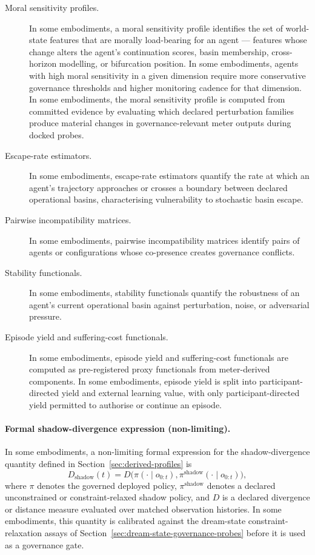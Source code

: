 \documentclass[a4paper,12pt]{article}
\begin{document}
\begin{description}
  \item[Moral sensitivity profiles.] In some embodiments, a moral
    sensitivity profile identifies the set of world-state features
    that are morally load-bearing for an agent --- features whose
    change alters the agent's continuation scores, basin membership,
    cross-horizon modelling, or bifurcation position. In some
    embodiments, agents with high moral sensitivity in a given
    dimension require more conservative governance thresholds and
    higher monitoring cadence for that dimension. In some embodiments,
    the moral sensitivity profile is computed from committed evidence
    by evaluating which declared perturbation families produce
    material changes in governance-relevant meter outputs during
    docked probes.
  \item[Escape-rate estimators.] In some embodiments, escape-rate
    estimators quantify the rate at which an agent's trajectory
    approaches or crosses a boundary between declared operational
    basins, characterising vulnerability to stochastic basin escape.
  \item[Pairwise incompatibility matrices.] In some embodiments,
    pairwise incompatibility matrices identify pairs of agents or
    configurations whose co-presence creates governance conflicts.
  \item[Stability functionals.] In some embodiments, stability
    functionals quantify the robustness of an agent's current
    operational basin against perturbation, noise, or adversarial
    pressure.
  \item[Episode yield and suffering-cost functionals.] In some
    embodiments, episode yield and suffering-cost functionals are
    computed as pre-registered proxy functionals from meter-derived
    components. In some embodiments, episode yield is split into
    participant-directed yield and external learning value, with
    only participant-directed yield permitted to authorise or
    continue an episode.
\end{description}
\paragraph{Formal shadow-divergence expression (non-limiting).}
In some embodiments, a non-limiting formal expression for the
shadow-divergence quantity defined in
Section~\ref{sec:derived-profiles} is
\[
  D_{\mathrm{shadow}}(t)
  =
  D\!\bigl(
    \pi(\cdot\mid o_{0:t}),
    \pi^{\mathrm{shadow}}(\cdot\mid o_{0:t})
  \bigr),
\]
where $\pi$ denotes the governed deployed policy,
$\pi^{\mathrm{shadow}}$ denotes a declared unconstrained or
constraint-relaxed shadow policy, and $D$ is a declared divergence or
distance measure evaluated over matched observation histories. In some
embodiments, this quantity is calibrated against the dream-state
constraint-relaxation assays of
Section~\ref{sec:dream-state-governance-probes} before it is used as a
governance gate.
\end{document}

